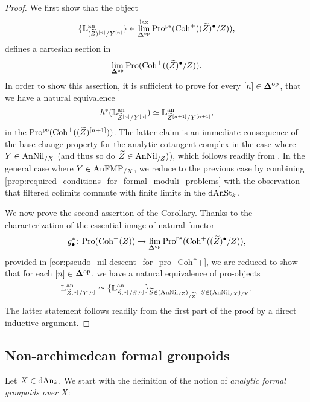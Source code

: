 \documentclass[10pt,a4paper,reqno]{amsart} %
\theoremstyle{plain}
\theoremstyle{definition}
\theoremstyle{remark}
\numberwithin{equation}{section}
\begin{document}
\begin{proof}
    We first show that the object
        \[\{ \mathbb L^\mathrm{an}_{(\widetilde Z)^{[n]}/ Y^{[n]}} \}  \in \lim_{\bm{\Delta} ^\mathrm{op}}^\mathrm{lax}\mathrm{Pro}^\mathrm{ps}(\mathrm{Coh}^+((\widetilde Z)^\bullet/ Z)),\]
    defines a cartesian section in
        \[
            \lim_{\bm{\Delta} ^\mathrm{op}} \mathrm{Pro}(\mathrm{Coh}^+((\widetilde Z)^\bullet / Z)).  
        \]
    In order to show this assertion, it is sufficient to prove for every $[n ] \in \bm{\Delta} ^\mathrm{op}$, that we have a natural equivalence
        \[
            h^*(\mathbb L^\mathrm{an}_{\widetilde Z^{[n]} / Y^{[n]}}) \simeq \mathbb L^\mathrm{an}_{\widetilde Z^{[n+1]}/ Y^{[n+1]}},  
        \]
    in the \infcat $\mathrm{Pro}^\mathrm{ps}(\mathrm{Coh}^+((\widetilde Z)^{[n+1]}))$. The latter claim is an immediate consequence of the base change property for the analytic
    cotangent complex in the case where $Y \in \mathrm{AnNil}_{/X}$ (and thus so do $\widetilde Z \in \mathrm{AnNil}_{/Z})$), which follows readily from
    \cite[Proposition 5.12]{Porta_Yu_Representability}. In the general case where $Y \in \mathrm{AnFMP}_{/X}$, we reduce to the previous case
    by combining \cref{prop:required_conditions_for_formal_moduli_problems} with the observation that filtered colimits
    commute with finite limits in the \infcat $\mathrm{dAnSt}_k$. 

    We now prove the second assertion of the Corollary. Thanks to the characterization of the essential image of natural functor
        \[
            g^*_{\bullet} \colon \mathrm{Pro}(\mathrm{Coh}^+(Z)) \to \lim_{\bm{\Delta} ^\mathrm{op}} \mathrm{Pro}^\mathrm{ps}(\mathrm{Coh}^+((\widetilde Z)^\bullet /Z)),  
        \]
    provided in \cref{cor:pseudo_nil-descent_for_pro_Coh^+}, we are reduced to show that for each $[n] \in \bm{\Delta} ^\mathrm{op}$, we have a natural
    equivalence of pro-objects
        \[
            \mathbb L^\mathrm{an}_{\widetilde Z^{[n]} / Y^{[n]}} \simeq \{ \mathbb L^\mathrm{an}_{\widetilde S^{[n]}/ S^{[n]}} \}_{\widetilde S \in (\mathrm{AnNil}_{/ Z})_{/\widetilde Z}, \ S \in (\mathrm{AnNil}_{/X})_{/ Y}}.
        \]
    The latter statement follows readily from the first part of the proof by a direct inductive argument.
\end{proof}


\subsection{Non-archimedean formal groupoids} Let $X \in \mathrm{dAn}_k$.
We start with the definition of the notion of \emph{analytic formal groupoids over $X$}:
\end{document}
